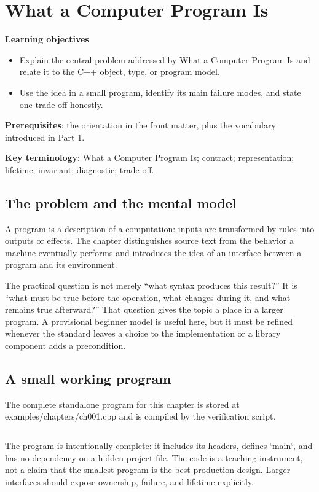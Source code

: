 \chapter{What a Computer Program Is}
\begin{chaptermeta}
\textbf{Learning objectives}
\begin{itemize}
  \item Explain the central problem addressed by What a Computer Program Is and relate it to the C++ object, type, or program model.
  \item Use the idea in a small program, identify its main failure modes, and state one trade-off honestly.
\end{itemize}
\textbf{Prerequisites}: the orientation in the front matter, plus the vocabulary introduced in Part 1.

\textbf{Key terminology}: What a Computer Program Is; contract; representation; lifetime; invariant; diagnostic; trade-off.
\end{chaptermeta}

\section{The problem and the mental model}
A program is a description of a computation: inputs are transformed by rules into outputs or effects. The chapter distinguishes source text from the behavior a machine eventually performs and introduces the idea of an interface between a program and its environment.

The practical question is not merely “what syntax produces this result?” It is “what must be true before the operation, what changes during it, and what remains true afterward?” That question gives the topic a place in a larger program. A provisional beginner model is useful here, but it must be refined whenever the standard leaves a choice to the implementation or a library component adds a precondition.

\section{A small working program}
The complete standalone program for this chapter is stored at examples/chapters/ch001.cpp and is compiled by the verification script.

\inputminted[fontsize=\scriptsize,breaklines]{cpp}{examples/chapters/ch001.cpp}

The program is intentionally complete: it includes its headers, defines `main`, and has no dependency on a hidden project file. The code is a teaching instrument, not a claim that the smallest program is the best production design. Larger interfaces should expose ownership, failure, and lifetime explicitly.

